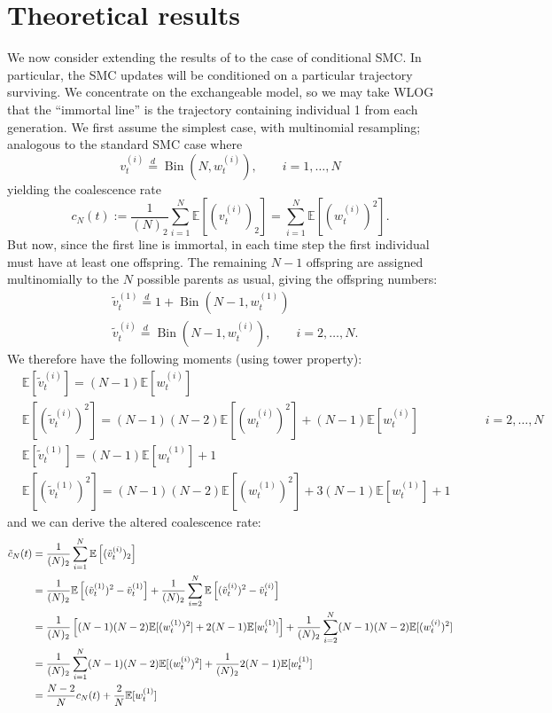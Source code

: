 \documentclass{article}
\newcommand{\E}{\mathbb{E}}
\newcommand{\vt}[2][t]{v_{#1}^{(#2)}}
\newcommand{\vttilde}[2][t]{\tilde{v}_{#1}^{(#2)}}
\newcommand{\wt}[2][t]{w_{#1}^{(#2)}}
\newcommand{\eqdist}{\overset{d}{=}}
\newcommand{\Bin}{\operatorname{Bin}}
\begin{document}
\section{Theoretical results}
We now consider extending the results of \citet{koskela2018} to the case of conditional SMC.
In particular, the SMC updates will be conditioned on a particular trajectory surviving. We concentrate on the exchangeable model, so we may take WLOG that the ``immortal line'' is the trajectory containing individual 1 from each generation.
We first assume the simplest case, with multinomial resampling; analogous to the standard SMC case where
\begin{equation*}
\vt{i} \eqdist \Bin (N, \wt{i}), \qquad i=1,\dots,N
\end{equation*}
yielding the coalescence rate
\begin{equation}
c_N(t) := \frac{1}{(N)_2} \sum_{i=1}^{N} \E\left[ (\vt{i})_2 \right] = \sum_{i=1}^{N} \E\left[(\wt{i})^2\right].
\end{equation}
But now, since the first line is immortal, in each time step the first individual must have at least one offspring. The remaining $N-1$ offspring are assigned multinomially to the $N$ possible parents as usual, giving the offspring numbers:
\begin{align*}
& \vttilde{1} \eqdist 1 + \Bin(N-1, \wt{1}) \\
& \vttilde{i} \eqdist \Bin(N-1, \wt{i}), \qquad i=2,\dots,N.
\end{align*}
We therefore have the following moments (using tower property):
\begin{align*}
& \E[\vttilde{i}] = (N-1)\E[\wt{i}] &\\
& \E[(\vttilde{i})^2] = (N-1)(N-2)\E[(\wt{i})^2] + (N-1)\E[\wt{i}] &\qquad i=2,\dots,N \\
& \E[\vttilde{1}] = (N-1)\E[\wt{1}] + 1 \\
& \E[(\vttilde{1})^2] = (N-1)(N-2)\E[(\wt{1})^2] + 3(N-1)\E[\wt{1}] + 1 &
\end{align*}
and we can derive the altered coalescence rate:
\begin{align}
\tilde{c}_N(t) &= \frac{1}{(N)_2} \sum_{i=1}^{N} \E\left[ (\vttilde{i})_2 \right] \notag\\
&= \frac{1}{(N)_2} \E\left[ (\vttilde{1})^2 - \vttilde{1} \right] + \frac{1}{(N)_2}\sum_{i=2}^{N} \E\left[ (\vttilde{i})^2 - \vttilde{i} \right] \notag\\
&= \frac{1}{(N)_2}\left[ (N-1)(N-2)\E[(\wt{1})^2] + 2(N-1)\E[\wt{1}] \right] + \frac{1}{(N)_2} \sum_{i=2}^{N} (N-1)(N-2)\E[(\wt{i})^2] \notag\\
&= \frac{1}{(N)_2} \sum_{i=1}^{N} (N-1)(N-2)\E[(\wt{i})^2] + \frac{1}{(N)_2} 2(N-1)\E[\wt{1}] \notag\\
&= \frac{N-2}{N} c_N(t) + \frac{2}{N} \E[\wt{1}]
\end{align}
\end{document}
